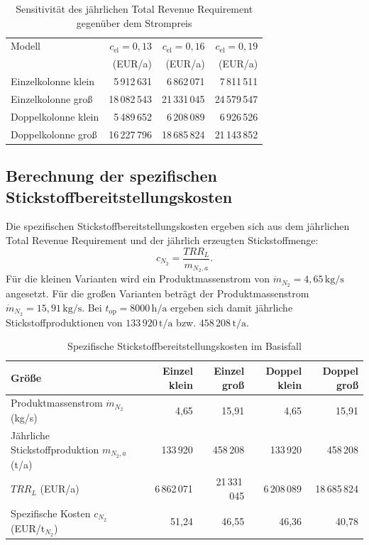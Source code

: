 \begin{table}[H]
\centering
\caption{Sensitivität des jährlichen Total Revenue Requirement gegenüber dem Strompreis}
\label{tab:sensitivitaet_trr_strompreis}
\small
\begin{tabular}{lrrr}
\hline
Modell 
& $c_\mathrm{el}=0{,}13$ 
& $c_\mathrm{el}=0{,}16$ 
& $c_\mathrm{el}=0{,}19$ \\
 & (EUR/a) & (EUR/a) & (EUR/a) \\
\hline
Einzelkolonne klein 
& 5\,912\,631
& 6\,862\,071
& 7\,811\,511 \\

Einzelkolonne groß  
& 18\,082\,543
& 21\,331\,045
& 24\,579\,547 \\

Doppelkolonne klein 
& 5\,489\,652
& 6\,208\,089
& 6\,926\,526 \\

Doppelkolonne groß  
& 16\,227\,796
& 18\,685\,824
& 21\,143\,852 \\
\hline
\end{tabular}
\end{table}

\subsection*{Berechnung der spezifischen Stickstoffbereitstellungskosten}

Die spezifischen Stickstoffbereitstellungskosten ergeben sich aus dem
jährlichen Total Revenue Requirement und der jährlich erzeugten
Stickstoffmenge:
\begin{equation}
c_{N_2}
=
\frac{TRR_L}{m_{N_2,a}} .
\end{equation}
Für die kleinen Varianten wird ein Produktmassenstrom von
\(\dot m_{N_2}=4{,}65\,\mathrm{kg/s}\) angesetzt. Für die großen Varianten
beträgt der Produktmassenstrom \(\dot m_{N_2}=15{,}91\,\mathrm{kg/s}\).
Bei \(t_\mathrm{op}=8000\,\mathrm{h/a}\) ergeben sich damit jährliche
Stickstoffproduktionen von \(133\,920\,\mathrm{t/a}\) bzw.
\(458\,208\,\mathrm{t/a}\).

\begin{table}[H]
\centering
\caption{Spezifische Stickstoffbereitstellungskosten im Basisfall}
\label{tab:spezifische_stickstoffkosten}
\small
\begin{tabular}{lrrrr}
\hline
Größe 
& Einzel klein 
& Einzel groß 
& Doppel klein 
& Doppel groß \\
\hline
Produktmassenstrom $\dot m_{N_2}$ (kg/s) 
& 4{,}65 
& 15{,}91 
& 4{,}65 
& 15{,}91 \\

Jährliche Stickstoffproduktion $m_{N_2,a}$ (t/a) 
& 133\,920 
& 458\,208 
& 133\,920 
& 458\,208 \\

$TRR_L$ (EUR/a) 
& 6\,862\,071
& 21\,331\,045
& 6\,208\,089
& 18\,685\,824 \\
\hline

Spezifische Kosten $c_{N_2}$ (EUR/t$_{N_2}$) 
& 51{,}24
& 46{,}55
& 46{,}36
& 40{,}78 \\
\hline
\end{tabular}
\end{table}

